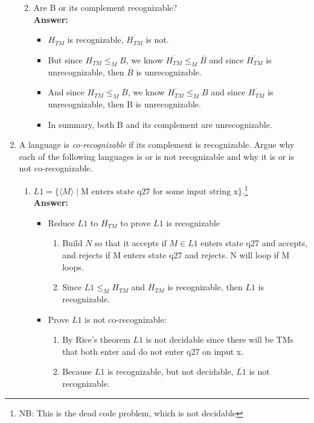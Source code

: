 \documentclass[12pt]{article}
\begin{document}
\begin{enumerate}
\begin{enumerate}
\begin{itemize}
			\end{itemize}
		\item Are B or its complement recognizable?
			\\[.2in]\textbf{Answer:}
			\begin{itemize}
			\item $H_{TM}$ is recognizable, $\overline{H_{TM}}$ is not.
			\item But since $H_{TM} \leq_{M}B$, we know $\overline{H_{TM}} \leq_{M} \overline{B}$ and since $\overline{H_{TM}}$ is unrecognizable, then $\overline{B}$ is unrecognizable.
			\item And since $H_{TM} \leq_{M} \overline{B}$, we know $\overline{H_{TM}} \leq_{M} B$ and since $\overline{H_{TM}}$ is unrecognizable, then B is unrecognizable.
			\item In summary, both B and its complement are unrecognizable.
			\end{itemize}
		\end{enumerate}
\newpage
	\item A language is \textit{co-recognizable} if its complement is recognizable. Argue why each of the following languages is or is not recognizable and why it is or is not co-recognizable.
		\begin{enumerate}
		\item $L1 = \{\langle M \rangle \mid \mbox{M enters state q27 for some input string x}\}$.\footnote{NB: This is the dead code problem, which is not decidable}
			\\[.2in]\textbf{Answer:}
			\begin{itemize}
			\item Reduce $L1$ to $H_{TM}$ to prove $L1$ is recognizable
			\begin{enumerate}
			\item Build $N$ so that it accepts if $M \in L1$ enters state q27 and accepts, and rejects if M enters state q27 and rejects. N will loop if M loops.
			\item Since $L1 \leq_{M} H_{TM}$ and $H_{TM}$ is recognizable, then $L1$ is recognizable.
			\end{enumerate}
			\item Prove $L1$ is not co-recognizable:
			\begin{enumerate}
			\item By Rice's theorem $L1$ is not decidable since there will be TMs that both enter and do not enter q27 on input x.
			\item Because $L1$ is recognizable, but not decidable, $\overline{L1}$ is not recognizable.

\end{enumerate}
\end{itemize}
\end{enumerate}
\end{enumerate}
\end{document}
